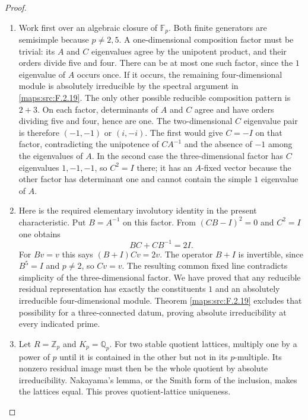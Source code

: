 \begin{proof}
\begin{enumerate}[label={$\langle1\rangle$\arabic*.}]
\item Work first over an algebraic closure of $\mathbb F_p$.
Both finite generators are semisimple because $p\ne2,5$.
A one-dimensional composition factor must be trivial:
its $A$ and $C$ eigenvalues agree by the unipotent product,
and their orders divide five and four.
There can be at most one such factor, since the $1$
eigenvalue of $A$ occurs once.
If it occurs, the remaining four-dimensional module is
absolutely irreducible by the spectral argument in \ref{maps:src:F.2.19}.
The only other possible reducible composition pattern is
$2+3$.
On each factor, determinants of $A$ and $C$ agree and
have orders dividing five and four, hence are one.
The two-dimensional $C$ eigenvalue pair is therefore
$(-1,-1)$ or $(i,-i)$.
The first would give $C=-I$ on that factor, contradicting
the unipotence of $CA^{-1}$ and the absence of $-1$
among the eigenvalues of $A$.
In the second case the three-dimensional factor has
$C$ eigenvalues $1,-1,-1$, so $C^2=I$ there; it has
an $A$-fixed vector because the other factor has determinant
one and cannot contain the simple $1$ eigenvalue of $A$.

\item Here is the required elementary involutory identity in the
present characteristic.  Put $B=A^{-1}$ on this factor.
From $(CB-I)^2=0$ and $C^2=I$ one obtains
\[
 BC+CB^{-1}=2I.
\]
For $Bv=v$ this says $(B+I)Cv=2v$.
The operator $B+I$ is invertible, since $B^5=I$ and
$p\ne2$, so $Cv=v$.  The resulting common fixed line
contradicts simplicity of the three-dimensional factor.
We have proved that any reducible residual representation
has exactly the constituents $1$ and an absolutely
irreducible four-dimensional module.  Theorem \ref{maps:src:F.2.19}
excludes that possibility for a three-connected datum, proving absolute
irreducibility at every indicated prime.

\item Let $R=\mathbb Z_p$ and $K_p=\mathbb Q_p$.
For two stable quotient lattices, multiply one by a power
of $p$ until it is contained in the other but not in its
$p$-multiple.  Its nonzero residual image must then be the
whole quotient by absolute irreducibility.  Nakayama's
lemma, or the Smith form of the inclusion, makes the
lattices equal.  This proves quotient-lattice uniqueness.


\end{enumerate}
\end{proof}
